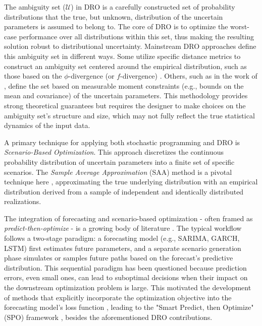 \documentclass[review,a4paper,fleqn,3p,11pt,authoryear]{elsarticle}
\begin{document}
The ambiguity set ($\mathcal{U}$) in DRO is a carefully constructed set of probability distributions that the true, but unknown, distribution of the uncertain parameters is assumed to belong to. The core of DRO is to optimize the worst-case performance over all distributions within this set, thus making the resulting solution robust to distributional uncertainty. Mainstream DRO approaches define this ambiguity set in different ways. Some utilize specific distance metrics to construct an ambiguity set centered around the empirical distribution, such as those based on the $\phi$-divergence (or $f$-divergence) \citep{BK19}. Others, such as in the work of \citet{EK17}, define the set based on measurable moment constraints (e.g., bounds on the mean and covariance) of the uncertain parameters. This methodology provides strong theoretical guarantees but requires the designer to make choices on the ambiguity set's structure and size, which may not fully reflect the true statistical dynamics of the input data.

A primary technique for applying both stochastic programming and DRO is {\it Scenario-Based Optimization}. This approach discretizes the continuous probability distribution of uncertain parameters into a finite set of specific scenarios. The {\it Sample Average Approximation} (SAA) method is a pivotal technique here \citep{SH98}, approximating the true underlying distribution with an empirical distribution derived from a sample of independent and identically distributed realizations.

The integration of forecasting and scenario-based optimization - often framed as {\it predict-then-optimize} - is a growing body of literature \citep{BK19,R18}. The typical workflow follows a two-stage paradigm: a forecasting model (e.g., SARIMA, GARCH, LSTM) first estimates future parameters, and a separate scenario generation phase simulates or samples future paths based on the forecast's predictive distribution. This sequential paradigm has been questioned because prediction errors, even small ones, can lead to suboptimal decisions when their impact on the downstream optimization problem is large. This motivated the development of methods that explicitly incorporate the optimization objective into the forecasting model's loss function \citep{DAK17}, leading to the "Smart Predict, then Optimize" (SPO) framework \citep{EG22}, besides the aforementioned DRO contributions.
\end{document}
